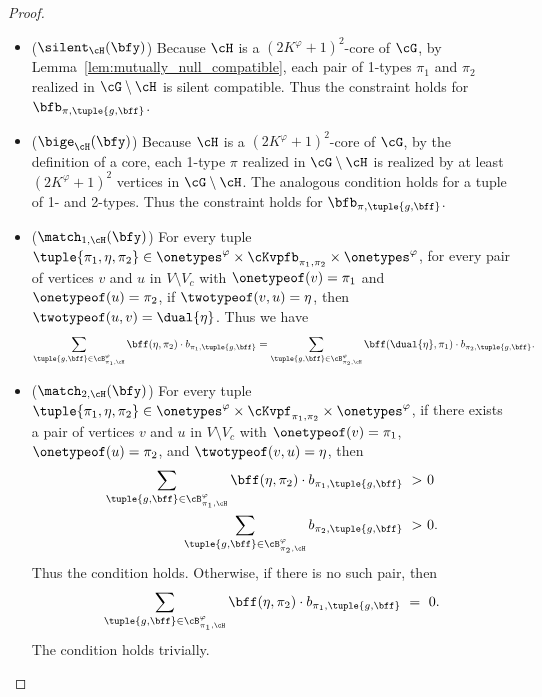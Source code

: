 \begin{proof}
\begin{itemize}
        \item ($\silent_{\cH}(\bfy)$)
            Because $\cH$ is a $(2K^\varphi+1)^2$-core of $\cG$,
            by Lemma~\ref{lem:mutually_null_compatible},
            each pair of 1-types $\pi_1$ and $\pi_2$ realized in $\cG \setminus \cH$ is silent compatible.
            Thus the constraint holds for $\bfb_{\pi, \tuple{g, \bff}}$.

        \item ($\bige_{\cH}(\bfy)$)
            Because $\cH$ is a $(2K^\varphi+1)^2$-core of $\cG$,
            by the definition of a core,
            each 1-type $\pi$ realized in $\cG \setminus \cH$
            is realized by at least $(2K^\varphi+1)^2$ vertices in $\cG \setminus \cH$.
            The analogous condition holds for a tuple of 1- and 2-types.
            Thus the constraint holds for $\bfb_{\pi, \tuple{g, \bff}}$.

        \item ($\match_{1, \cH}(\bfy)$)
            For every tuple $\tuple{\pi_1, \eta, \pi_2} \in \onetypes^\varphi \times \cKvpfb_{\pi_1, \pi_2} \times \onetypes^\varphi$,
            for every pair of vertices $v$ and $u$ in $V \setminus V_c$
            with $\onetypeof(v) = \pi_1$ and $\onetypeof(u) = \pi_2$,
            if $\twotypeof(v, u) = \eta$,
            then $\twotypeof(u, v) = \dual{\eta}$.
            Thus we have
            \begin{equation*}
                \sum_{\tuple{g, \bff} \in \cB^\varphi_{\pi_1, \cH}} \bff(\eta, \pi_2) \cdot b_{\pi_1, \tuple{g, \bff}}
                =
                \sum_{\tuple{g, \bff} \in \cB^\varphi_{\pi_2, \cH}} \bff(\dual{\eta}, \pi_1) \cdot b_{\pi_2, \tuple{g, \bff}}.
            \end{equation*}

        \item ($\match_{2, \cH}(\bfy)$)
            For every tuple $\tuple{\pi_1, \eta, \pi_2} \in \onetypes^\varphi \times \cKvpf_{\pi_1, \pi_2} \times \onetypes^\varphi$,
            if there exists a pair of vertices $v$ and $u$ in $V \setminus V_c$
            with $\onetypeof(v) = \pi_1$, $\onetypeof(u) = \pi_2$,
            and $\twotypeof(v, u) = \eta$,
            then
            \begin{equation*}
                \begin{aligned}
                    \sum_{\tuple{g, \bff} \in \cB^\varphi_{\pi_1, \cH}} \bff(\eta, \pi_2) \cdot b_{\pi_1, \tuple{g, \bff}}\ >\ &0 \\
                    \sum_{\tuple{g, \bff} \in \cB^\varphi_{\pi_2, \cH}} b_{\pi_2, \tuple{g, \bff}}\ >\ &0.
                \end{aligned}
            \end{equation*}
            Thus the condition holds.
            Otherwise, if there is no such pair, then
            \begin{equation*}
                 \sum_{\tuple{g, \bff} \in \cB^\varphi_{\pi_1, \cH}} \bff(\eta, \pi_2) \cdot b_{\pi_1, \tuple{g, \bff}}\ =\ 0.   
            \end{equation*}
            The condition holds trivially.
    \end{itemize}



\end{proof}
